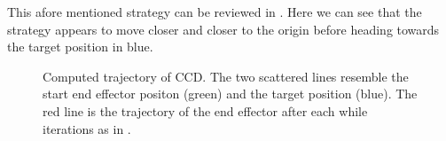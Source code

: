 This afore mentioned strategy can be reviewed in . Here we can see that the strategy appears to move closer and closer to the origin before heading towards the target position in blue.
\begin{figure}
    \begin{center}
        \hfill
		\hfill
    \end{center}
    \caption[ccd trajectory]{Computed trajectory of CCD. The two scattered lines resemble the start end effector positon (green) and the target position (blue). The red line is the trajectory of the end effector after each while iterations as in . }
    \label{fig:ccd_trajectory}
\end{figure}

